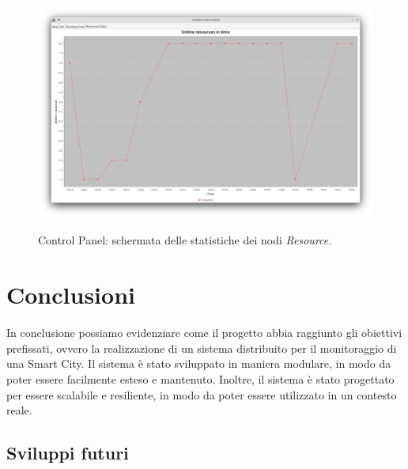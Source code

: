 \documentclass{scrartcl}
\begin{document}
\begin{figure}[H]
    \caption{Control Panel: schermata delle statistiche dei nodi \textit{Resource}.}
    \includegraphics[width=\textwidth]{../assets/images/control-panel-resources-stats.png}
    \label{fig:control-panel-resources-stats}
\end{figure}

\section{Conclusioni}

In conclusione possiamo evidenziare come il progetto abbia raggiunto gli obiettivi prefissati, ovvero la realizzazione di un sistema distribuito per il monitoraggio di una Smart City. Il sistema è stato sviluppato in maniera modulare, in modo da poter essere facilmente esteso e mantenuto. Inoltre, il sistema è stato progettato per essere scalabile e resiliente, in modo da poter essere utilizzato in un contesto reale.

\subsection{Sviluppi futuri}
\end{document}
